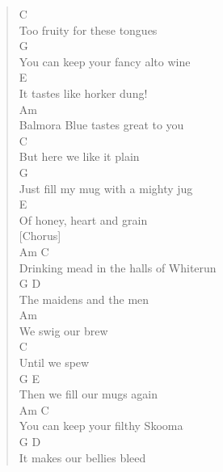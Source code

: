 \documentclass[11pt]{article}
\begin{document}
\begin{verse}
\hspace*{5em}C\\
Too fruity for these tongues\\
\hspace*{8em}G\\
You can keep your fancy alto wine\\
\hspace*{3em}E\\
It tastes like horker dung!\\
\vspace*{1em}
\hspace*{3em}Am\\
Balmora Blue tastes great to you\\
\hspace*{4em}C\\
But here we like it plain\\
\hspace*{5em}G\\
Just fill my mug with a mighty jug\\
\hspace*{3em}E\\
Of honey, heart and grain\\
\vspace*{1em}
[Chorus]\\
\hspace*{9em}Am                   C\\
Drinking mead in the halls of Whiterun\\
\hspace*{4em}G               D\\
The maidens and the men\\
\hspace*{3em}Am\\
We swig our brew\\
\hspace*{2em}C\\
Until we spew\\
\hspace*{8em}G              E\\
Then we fill our mugs again\\
\vspace*{1em}
\hspace*{8em}Am               C\\
You can keep your filthy Skooma\\
\hspace*{3em}G                 D\\
It makes our bellies bleed\\

\end{verse}
\end{document}
